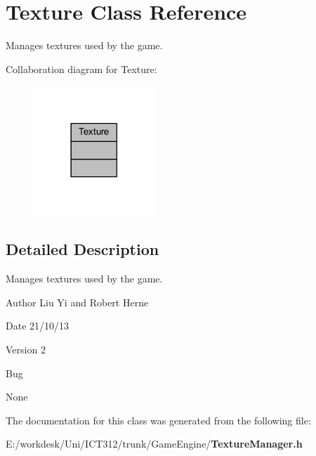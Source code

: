 \section{Texture Class Reference}
\label{class_texture}


Manages textures used by the game.  




Collaboration diagram for Texture\+:\nopagebreak
\begin{figure}[H]
\begin{center}
\leavevmode
\includegraphics[width=129pt]{d7/da2/class_texture__coll__graph}
\end{center}
\end{figure}


\subsection{Detailed Description}
Manages textures used by the game. 

\begin{DoxyAuthor}{Author}
Liu Yi and Robert Herne 
\end{DoxyAuthor}
\begin{DoxyDate}{Date}
21/10/13 
\end{DoxyDate}
\begin{DoxyVersion}{Version}
2
\end{DoxyVersion}
\begin{DoxyRefDesc}{Bug}
\item[{\bf Bug}]None \end{DoxyRefDesc}


The documentation for this class was generated from the following file\+:\begin{DoxyCompactItemize}
\item 
E\+:/workdesk/\+Uni/\+I\+C\+T312/trunk/\+Game\+Engine/{\bf Texture\+Manager.\+h}\end{DoxyCompactItemize}
